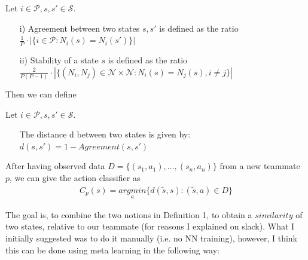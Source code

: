 \documentclass[a4paper, 11pt]{article}
\begin{document}
	\begin{Def} {Let $i\in\mathcal{P}, s, s'\in\mathcal{S}$.}
		\begin{itemize}
			\item[i)] Agreement between two states $s,s'$ is defined as the ratio  $\frac{1}{P}\cdot|\{ i \in\mathcal{P}: N_i(s) = N_i(s')\}|$
			\item[ii)] Stability of a state $s$ is defined as the ratio
			$\frac{2}{P(P-1)}\cdot|\{ (N_i, N_j) \in\mathcal{N}\times\mathcal{N}: N_i(s) = N_j(s), i\neq j\}|$
		\end{itemize}
		
	\end{Def}

	Then we can define
	\begin{Def}[Distance] {Let $i\in\mathcal{P}, s, s'\in\mathcal{S}$.}
		\begin{itemize}
			\item[]  The distance d between two states is given by: $d(s, s') = 1 - Agreement(s,s')$
		\end{itemize}
		
	\end{Def}
	After having observed data $D = \{(s_1, a_1),...,(s_n,a_n)\}$ from a new teammate $p$, we can give the action classifier as 
	\begin{align*}
	C_p(s) = \underset{a}{argmin} \{ d(\tilde{s}, s): (\tilde{s}, a)\in D \}
	\end{align*}
	
	The goal is, to combine the two notions in Definition 1, to obtain a $similarity$ of two states, relative to our teammate (for reasons I explained on slack). What I initially suggested was to do it manually (i.e. no NN training), however, I think this can be done using meta learning in the following way: \\
\end{document}

